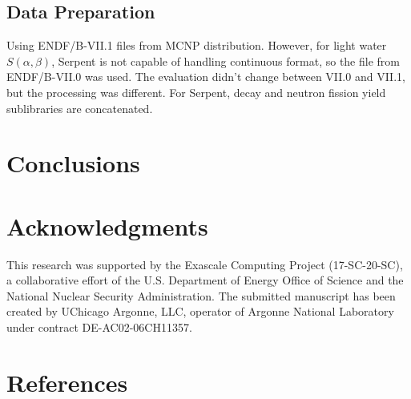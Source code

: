 \documentclass[3p,authoryear]{elsarticle}
\begin{document}
\subsection{Data Preparation}

Using ENDF/B-VII.1 files from MCNP distribution. However, for light water
$S(\alpha,\beta)$, Serpent is not capable of handling continuous format, so the
file from ENDF/B-VII.0 was used. The evaluation didn't change between VII.0 and
VII.1, but the processing was different. For Serpent, decay and neutron fission
yield sublibraries are concatenated.

\subsection{}


\section{Conclusions}
\label{sec:conclusions}

\section*{Acknowledgments}

This research was supported by the Exascale Computing Project (17-SC-20-SC), a
collaborative effort of the U.S. Department of Energy Office of Science and the
National Nuclear Security Administration. The submitted manuscript has been
created by UChicago Argonne, LLC, operator of Argonne National Laboratory under
contract DE-AC02-06CH11357.

\section*{References}




\clearpage
\vspace*{\fill}
\noindent{}
\vspace*{\fill}
\end{document}
